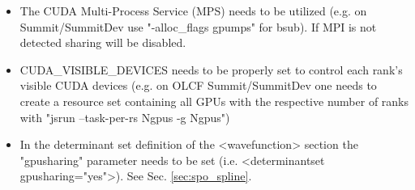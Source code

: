 \begin{itemize}
    \item The CUDA Multi-Process Service (MPS) needs to be utilized
      (e.g. on Summit/SummitDev use "-alloc\_flags gpumps" for
      bsub). If MPI is not detected sharing will be disabled.
    \item CUDA\_VISIBLE\_DEVICES needs to be properly set to control each
      rank's visible CUDA devices (e.g. on OLCF Summit/SummitDev one
      needs to create a resource set containing all GPUs with the
      respective number of ranks with "jsrun --task-per-rs Ngpus -g
      Ngpus")
    \item In the determinant set definition of the <wavefunction>
      section the "gpusharing" parameter needs to be set
      (i.e. <determinantset gpusharing="yes">). See Sec. \ref{sec:spo_spline}.
\end{itemize}
